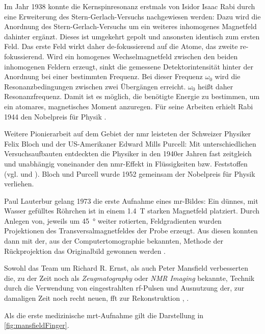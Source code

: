 Im Jahr 1938 konnte die Kernspinresonanz erstmals von Isidor Isaac Rabi durch eine Erweiterung des Stern-Gerlach-Versuchs nachgewiesen werden: Dazu wird die Anordnung des Stern-Gerlach-Versuchs um ein weiteres inhomogenes Magnetfeld dahinter ergänzt. Dieses ist umgekehrt gepolt und ansonsten identisch zum ersten Feld. Das erste Feld wirkt daher de-fokussierend auf die Atome, das zweite re-fokussierend. Wird ein homogenes Wechselmagnetfeld zwischen den beiden inhomogenen Feldern erzeugt, sinkt die gemessene Detektorintensität hinter der Anordnung bei einer bestimmten Frequenz. Bei dieser Frequenz $\omega_0$ wird die Resonanzbedingungen zwischen zwei Übergängen erreicht. $\omega_0$ heißt daher Resonanzfrequenz. Damit ist es möglich, die benötigte Energie zu bestimmen, um ein atomares, magnetisches Moment anzuregen. Für seine Arbeiten erhielt Rabi 1944 den Nobelpreis für Physik \cite{Rabi1938}.

Weitere Pionierarbeit auf dem Gebiet der \gls{nmr} leisteten der Schweizer Physiker Felix Bloch und der US-Amerikaner Edward Mills Purcell: Mit unterschiedlichen Versuchsaufbauten entdeckten die Physiker in den 1940er Jahren fast zeitgleich und unabhängig voneinander den \gls{nmr}-Effekt in Flüssigkeiten bzw. Feststoffen (vgl. \cite{Bloch1946} und \cite{Purcell1946}). Bloch und Purcell wurde 1952 gemeinsam der Nobelpreis für Physik verliehen.

Paul Lauterbur gelang 1973 die erste Aufnahme eines \gls{mr}-Bildes: Ein dünnes, mit Wasser gefülltes Röhrchen ist in einem \SI{1.4}{\tesla} starken Magnetfeld platziert. Durch Anlegen von, jeweils um \SI{45}{\degree} weiter rotierten, Feldgradienten wurden Projektionen des Transversalmagnetfeldes der Probe erzeugt. Aus diesen konnten dann mit der, aus der Computertomographie bekannten, Methode der Rückprojektion das Originalbild gewonnen werden \cite{LAUTERBUR1973}.

Sowohl das Team um Richard R. Ernst, als auch Peter Mansfield verbesserten die, zu der Zeit noch als \textit{Zeugmatography} oder \textit{NMR Imaging} bekannte, Technik durch die Verwendung von eingestrahlten \gls{rf}-Pulsen und Ausnutzung der, zur damaligen Zeit noch recht neuen, \gls{fft} zur Rekonstruktion \cite{Kumar1975}, \cite{Mansfield1977}.

Als die erste medizinische \gls{mrt}-Aufnahme gilt die Darstellung in \autoref{fig:mansfieldFinger}.


